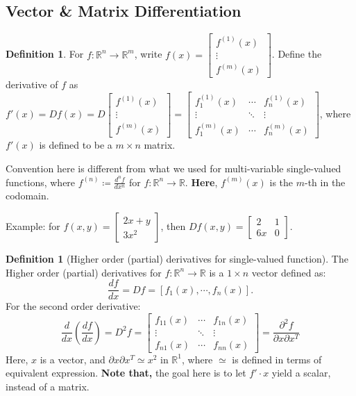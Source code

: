 \documentclass[12pt]{article}
\newcommand{\R}{{\mathbb R}}
\theoremstyle{definition}
\newtheorem{definition}[theorem]{Definition}
\theoremstyle{plain}
\begin{document}
\subsection{Vector \& Matrix Differentiation}
\setcounter{theorem}{0}
\begin{definition}
    For $f: \R^n \to \R^m$, write $f(x) =
    \begin{bmatrix}
        f^{(1)}(x) \\
        \vdots \\
        f^{(m)}(x)
    \end{bmatrix}
    $.
    Define the derivative of $f$ as $f'(x) = Df(x) = D
    \begin{bmatrix}
        f^{(1)}(x) \\
        \vdots \\
        f^{(m)}(x)
    \end{bmatrix} =
    \begin{bmatrix}
        f_1^{(1)} (x)  & \cdots  & f_n^{(1)} (x)\\
        \vdots & \ddots & \vdots \\
        f_1^{(m)}(x) & \cdots & f_n^{(m)} (x)
    \end{bmatrix}
    $, where $f'(x)$ is defined to be a $m \times n$ matrix.

    Convention here is different from what we used for multi-variable
    single-valued functions, where $f^{(n)} \coloneqq \frac{d^n f}{d x^n}$ for
    $f: \R^n \to \R$.
    \textbf{Here}, $f^{(m)}(x)$ is the $m$-th in the codomain.

    Example: for $f(x,y) =
    \begin{bmatrix}
        2x + y\\3x^2
    \end{bmatrix}$, then
    $D f(x,y) =
    \begin{bmatrix}
        2   & 1 \\
        6 x & 0
    \end{bmatrix}
    $.

    \begin{definition}
        [Higher order (partial) derivatives for single-valued function]
        The Higher order (partial) derivatives for $f: \R^n \to \R$ is a $1
        \times n$ vector defined as:
        \[
            \frac{df }{d x} = Df = [f_1(x), \cdots, f_n(x)].
        \]
        For the second order derivative:
        \[
            \frac{d}{dx}\left( \frac{d f}{dx} \right) = D^2 f =
            \begin{bmatrix}
                f_{11}(x) & \cdots & f_{1n}(x) \\
                \vdots & \ddots & \vdots \\
                f_{n1}(x) & \cdots & f_{nn} (x)
            \end{bmatrix}
            = \frac{\partial^2 f }{\partial x \partial x^T}
        \]
        Here, $x$ is a vector, and $\partial x \partial x^T \simeq x^2$ in
        $\R^1$, where $\simeq$ is defined in terms of equivalent expression.
        \textbf{Note that,} the goal here is to let $f' \cdot x$ yield a scalar,
        instead of a matrix.


\end{definition}
\end{definition}
\end{document}
